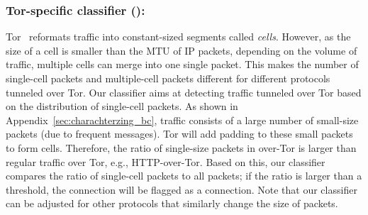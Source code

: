 \subsubsection{Tor-specific classifier ():}

Tor~\cite{tor} reformats traffic into constant-sized segments called  \emph{cells}. However, as the size of a cell is smaller than the MTU of IP packets, depending on the volume of traffic, multiple cells can merge into one single packet. This makes the number of single-cell packets and multiple-cell packets different for different protocols tunneled over Tor. Our  classifier aims at detecting \bc traffic tunneled over Tor based on the distribution of single-cell packets. 
As shown in Appendix~\ref{sec:charachterzing_bc}, \bc traffic consists of a large number of small-size packets (due to frequent  messages). Tor will add padding to these small packets to form cells. Therefore, the ratio of single-size packets in \bc over-Tor is larger than regular traffic over Tor, e.g., HTTP-over-Tor. Based on this, our classifier compares the ratio of single-cell packets to all packets; if the ratio is larger than a threshold, the connection will be flagged as a \bc connection. Note that our  classifier can be adjusted for other protocols that similarly change the size of packets.
\begin{comment}
\paragraph*{Tailoring for Tor Pluggable Transports}
 Through our experiments on \bc traffic over Tor pluggable Transports, we noticed that fraction of packets which have a specific size other than cell-size (for example, size $721$ in FTE ) are much larger than this value in normal traffic. Furthermore, this value is much larger than the fraction of packets which are in cell size. Therefore, when implementing sizeTor on pluggable transports, we compute the fraction of packets in these specific sizes to differentiate between \bc traffic and others.
\end{comment}

